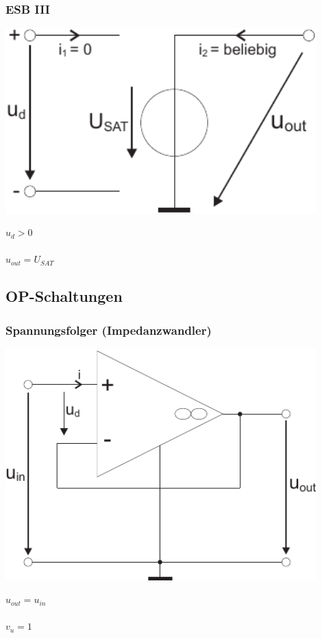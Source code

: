\documentclass[a4paper,twocolumn,10pt]{article}
\begin{document}
\subsubsection*{ESB III}
\begin{minipage}[b]{0.3\textwidth}
\includegraphics[width=0.9\textwidth]{Grafiken/OP_ESBIII}
\end{minipage}
\hfill
\begin{minipage}[b]{0.16\textwidth}
$u_d>0$\\\\
$u_{out}=U_{SAT}$
\end{minipage}

\subsection*{OP-Schaltungen}
\subsubsection*{Spannungsfolger (Impedanzwandler)}
\begin{minipage}[b]{0.3\textwidth}
\includegraphics[width=0.9\textwidth]{Grafiken/OP_SF}
\end{minipage}
\hfill
\begin{minipage}[b]{0.16\textwidth}
$u_{out}=u_{in}$\\\\
$v_u=1$
\end{minipage}
\end{document}
